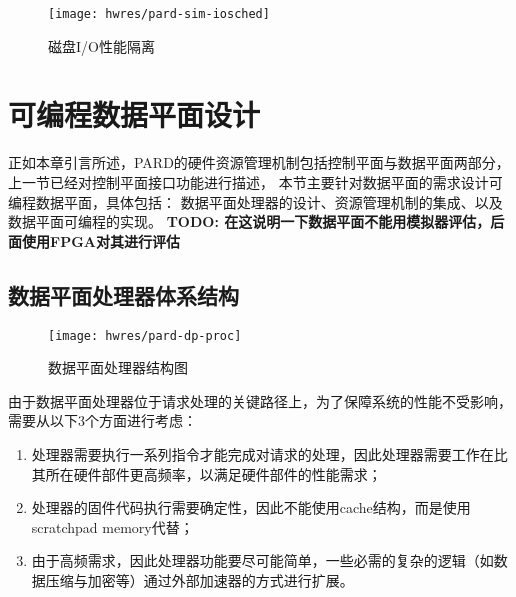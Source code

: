 \begin{figure}[tb]
  \centering
  \texttt{[image: hwres/pard-sim-iosched]}
  \caption{磁盘I/O性能隔离}
  \label{fig:pardsim:iosched}
\end{figure}


\section{可编程数据平面设计}
\label{chap:hwresman:dp}

正如本章引言所述，PARD的硬件资源管理机制包括控制平面与数据平面两部分，
上一节已经对控制平面接口功能进行描述，
本节主要针对数据平面的需求设计可编程数据平面，具体包括：
数据平面处理器的设计、资源管理机制的集成、以及数据平面可编程的实现。
\textbf{TODO: 在这说明一下数据平面不能用模拟器评估，后面使用FPGA对其进行评估}

%
%
%
%

\subsection{数据平面处理器体系结构}

\begin{figure}[tb]
  \centering
  \texttt{[image: hwres/pard-dp-proc]}
  \caption{数据平面处理器结构图}
  \label{fig:pard-dp-proc}
\end{figure}

由于数据平面处理器位于请求处理的关键路径上，为了保障系统的性能不受影响，需要从以下3个方面进行考虑：

\begin{enumerate}[leftmargin=2\parindent, nolistsep, label=\arabic*）]
  \item 处理器需要执行一系列指令才能完成对请求的处理，因此处理器需要工作在比其所在硬件部件更高频率，以满足硬件部件的性能需求；
  \item 处理器的固件代码执行需要确定性，因此不能使用cache结构，而是使用scratchpad memory代替；
  \item 由于高频需求，因此处理器功能要尽可能简单，一些必需的复杂的逻辑（如数据压缩与加密等）通过外部加速器的方式进行扩展。
\end{enumerate}

